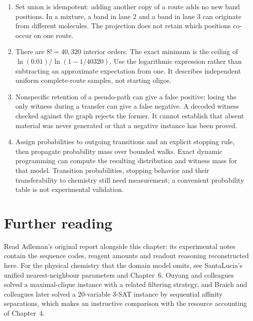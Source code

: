 \begin{enumerate}
\item Set union is idempotent: adding another copy of a route adds no new band positions. In a mixture, a band in lane 2 and a band in lane 3 can originate from different molecules. The projection does not retain which positions co-occur on one route.
\item There are $8!=40{,}320$ interior orders. The exact minimum is the ceiling of $\ln(0.01)/\ln(1-1/40320)$. Use the logarithmic expression rather than subtracting an approximate expectation from one. It describes independent uniform complete-route samples, not starting oligos.
\item Nonspecific retention of a pseudo-path can give a false positive; losing the only witness during a transfer can give a false negative. A decoded witness checked against the graph rejects the former. It cannot establish that absent material was never generated or that a negative instance has been proved.
\item Assign probabilities to outgoing transitions and an explicit stopping rule, then propagate probability mass over bounded walks. Exact dynamic programming can compute the resulting distribution and witness mass for that model. Transition probabilities, stopping behavior and their transferability to chemistry still need measurement; a convenient probability table is not experimental validation.
\end{enumerate}

\section*{Further reading}
Read Adleman's original report alongside this chapter; its experimental notes
contain the sequence codes, reagent amounts and readout reasoning reconstructed
here.\cite{Adleman1994} For the physical chemistry that the domain model omits,
see SantaLucia's unified nearest-neighbour parameters\cite{SantaLucia1998} and
Chapter~6. Ouyang and colleagues solved a maximal-clique instance with a
related filtering strategy,\cite{Ouyang1997} and Braich and colleagues later
solved a 20-variable 3-SAT instance by sequential affinity
separations,\cite{Braich2002} which makes an instructive comparison with the
resource accounting of Chapter~4.
